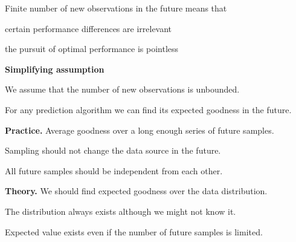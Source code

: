 \documentclass[landscape,footrule]{foils}
\begin{document}
Finite number of new observations in the future means that
\begin{triangles}
\item certain performance differences are irrelevant
\item the pursuit of optimal performance is pointless
\end{triangles}

\vspace*{2.0cm}
\textbf{Simplifying assumption}
\begin{triangles}
\item We assume that the number of new observations is unbounded.
\end{triangles}











\enlargethispage{1cm}

For any prediction algorithm we can find its expected goodness in the future.

\textbf{Practice.} Average goodness over a long enough series of future samples.

\begin{triangles}
\item Sampling should not change the data source in the future. 
\item All future samples should be independent from each other. 
\end{triangles} 
\vspace*{2ex}

\textbf{Theory.} We should find expected goodness over the data distribution.
\begin{triangles}
\item The distribution always exists although we might not know it.  
\item Expected value exists even if the number of future samples is limited.
\end{triangles} 
\bigskip
\end{document}
